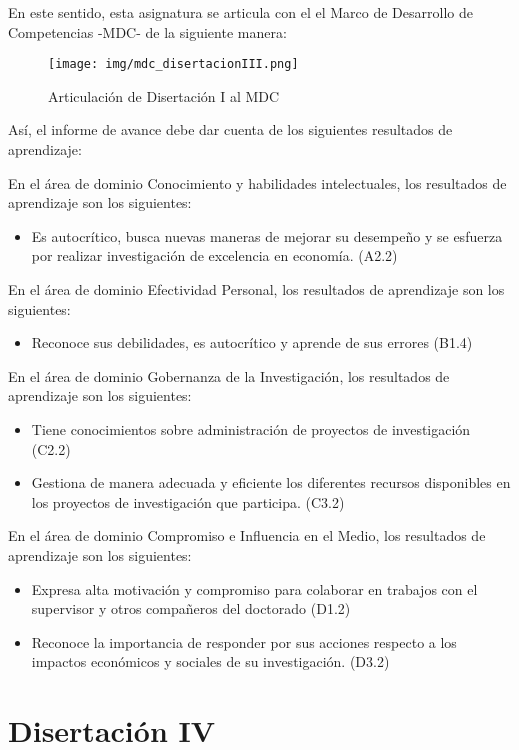 En este sentido, esta asignatura se articula con el el Marco de Desarrollo de Competencias -MDC- de la siguiente manera:

\begin{figure}[H]
\caption{Articulación de Disertación I al MDC \label{hito1_mdc} }
\begin{center}
\texttt{[image: img/mdc\_disertacionIII.png]}
\end{center}
\end{figure}

Así, el informe de avance debe dar cuenta de los siguientes resultados de aprendizaje:

En el área de dominio Conocimiento y habilidades intelectuales, los resultados de aprendizaje son los siguientes:
\begin{itemize}
\item	Es autocrítico, busca nuevas maneras de mejorar su desempeño y se esfuerza por realizar investigación de excelencia en economía. (A2.2)
\end{itemize}
En el área de dominio Efectividad Personal, los resultados de aprendizaje son los siguientes:
\begin{itemize}
\item	Reconoce sus debilidades, es autocrítico y aprende de sus errores (B1.4)
\end{itemize}
En el área de dominio Gobernanza de la Investigación, los resultados de aprendizaje son los siguientes:
\begin{itemize}
\item	Tiene conocimientos sobre administración de proyectos de investigación (C2.2)
\item	Gestiona de manera adecuada y eficiente los diferentes recursos disponibles en los proyectos de investigación que participa. (C3.2)
\end{itemize}
En el área de dominio Compromiso e Influencia en el Medio, los resultados de aprendizaje son los siguientes:
\begin{itemize}
\item	Expresa alta motivación y compromiso para colaborar en trabajos con el supervisor y otros compañeros del doctorado (D1.2)
\item	Reconoce la importancia de responder por sus acciones respecto a los impactos económicos y sociales de su investigación. (D3.2)
\end{itemize}

\section{Disertación IV}

